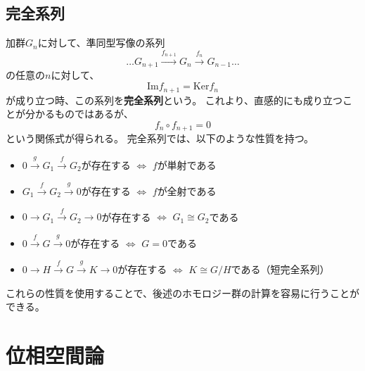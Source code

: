\documentclass[a4paper]{jsreport}
\begin{document}
            \subsection*{完全系列}
                加群$G_n$に対して、準同型写像の系列
                \begin{equation}
                    \dots G_{n+1} \xrightarrow{f_{n+1}} G_n \xrightarrow{f_n} G_{n-1} \dots
                \end{equation}
                の任意の$n$に対して、
                \begin{equation}
                    \text{Im} f_{n+1} = \text{Ker} f_n
                \end{equation}
                が成り立つ時、この系列を\textbf{完全系列}という。
                これより、直感的にも成り立つことが分かるものではあるが、
                \begin{equation}
                    f_n \circ f_{n+1} = 0
                \end{equation}
                という関係式が得られる。
                完全系列では、以下のような性質を持つ。
                \begin{itemize}
                  \item $0 \xrightarrow{g} G_1 \xrightarrow{f} G_2$が存在する $\Leftrightarrow$ $f$が単射である
                  \item $G_1 \xrightarrow{f} G_2 \xrightarrow{g} 0$が存在する $\Leftrightarrow$ $f$が全射である
                  \item $0 \xrightarrow{} G_1 \xrightarrow{f} G_2 \xrightarrow{} 0$が存在する $\Leftrightarrow$ $G_1 \cong G_2$である
                  \item $0 \xrightarrow{f} G \xrightarrow{g} 0$が存在する $\Leftrightarrow$ $G = 0$である
                  \item $0 \xrightarrow{} H \xrightarrow{f} G \xrightarrow{g} K \xrightarrow{} 0$が存在する $\Leftrightarrow$ $K \cong G/H$である（短完全系列）
                \end{itemize}
                これらの性質を使用することで、後述のホモロジー群の計算を容易に行うことができる。
        \section{位相空間論}
\end{document}
